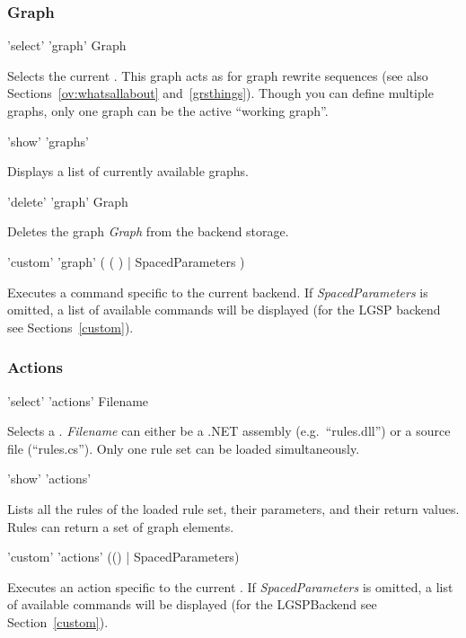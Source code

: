 \subsubsection*{Graph}

\begin{rail}
  'select' 'graph' Graph
\end{rail}
Selects the current .
This graph acts as \emph{} for graph rewrite sequences (see also Sections~\ref{ov:whatsallabout} and~\ref{grsthings}).
Though you can define multiple graphs, only one graph can be the active ``working graph''.

\begin{rail}
  'show' 'graphs'
\end{rail}
Displays a list of currently available graphs.

\begin{rail}
  'delete' 'graph' Graph
\end{rail}
Deletes the graph \emph{Graph} from the backend storage.

\begin{rail}
  'custom' 'graph' ( ( ) | SpacedParameters )
\end{rail}
Executes a command specific to the current backend.
If \emph{SpacedParameters} is omitted, a list of available commands will be displayed (for the LGSP backend see Sections~\ref{custom}).


\subsubsection*{Actions}

\begin{rail}
  'select' 'actions' Filename
\end{rail}
Selects a .
\emph{Filename} can either be a .NET assembly (e.g.\ ``rules.dll'') or a source file (``rules.cs'').
Only one rule set can be loaded simultaneously.

\begin{rail}
  'show' 'actions'
\end{rail}
Lists all the rules of the loaded rule set, their parameters, and their return values.
Rules can return a set of graph elements.

\begin{rail}
  'custom' 'actions' (() | SpacedParameters)
\end{rail}
Executes an action specific to the current .
If \emph{SpacedParameters} is omitted, a list of available commands will be displayed (for the LGSPBackend see Section~\ref{custom}).


